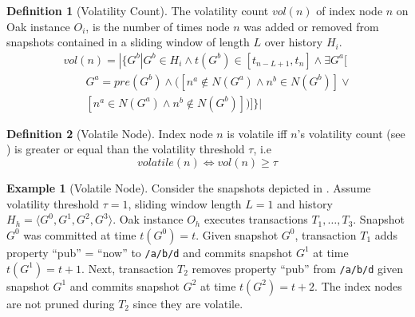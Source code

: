 \documentclass[abstracton,12pt]{scrartcl}
\theoremstyle{definition}
\newtheorem{definition}{Definition}
\newtheorem{example}{Example}
\begin{document}
\begin{definition}[Volatility Count]
  The volatility count $vol(n)$ of index node $n$ on Oak instance $O_i$, is the number of
  times node $n$ was added or removed from snapshots contained in a sliding
  window of length $L$ over history $H_i$.
  \begin{align*}
    vol(n) = | \{ G^b | G^b \in H_i \land t(G^b) \in [t_{n-L+1}, t_n] \land \exists G^a[ \\
    \qquad G^a = pre(G^b) \land ([n^a \notin N(G^a) \land n^b \in N(G^b)]\lor \\
    \qquad [n^a \in N(G^a) \land n^b \notin N(G^b)] )]\} |
  \end{align*}
  \label{def:vol_count}
\end{definition}

\begin{definition}[Volatile Node]
  Index node $n$ is volatile iff $n$'s volatility count (see
  ) is greater or equal than the volatility threshold
  $\tau$, i.e
  $$ volatile(n) \iff vol(n) \geq \tau $$
  \label{def:volatile_node}
\end{definition}

\begin{example}[Volatile Node]
  Consider the snapshots depicted in . Assume volatility
  threshold $\tau = 1$, sliding window length $L = 1$ and history $H_h
  = \langle G^0,G^1,G^2,G^3 \rangle$. Oak instance $O_h$ executes transactions
  $T_1, \dots , T_3$. Snapshot $G^0$ was committed at time $t(G^0) =
  t$. Given snapshot $G^0$, transaction $T_1$ adds property ``pub'' = ``now'' to
  \texttt{/a/b/d} and commits snapshot $G^1$ at time $t(G^1) = t + 1$. Next,
  transaction $T_2$ removes property ``pub'' from \texttt{/a/b/d} given snapshot
  $G^1$ and commits snapshot $G^2$ at time $t(G^2) = t + 2$. The index nodes are
  not pruned during $T_2$ since they are volatile.
  \label{ex:volatile_node}
\end{example}
\end{document}

